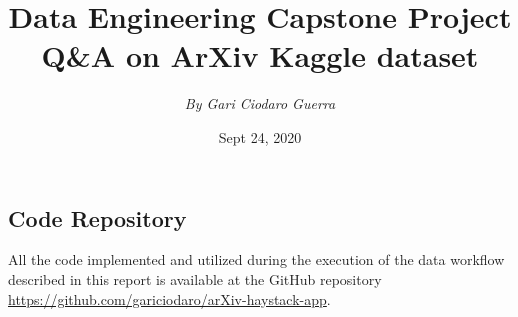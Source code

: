 \documentclass{article}
\title{
    \vspace{1.4cm}
    {\large \textbf{Data Engineering Capstone Project}} \\
    {\large \textbf{Q\&A on ArXiv Kaggle dataset}} \\
}
\author{\textit{By Gari Ciodaro Guerra}\\[0.2cm]}
\date{Sept 24, 2020}
\begin{document}
\maketitle


\newpage





\clearpage
\appendix
\begin{appendices}
\section{Code Repository}

All the code implemented and utilized during the execution of the data workflow
described in this report is available at the GitHub repository \href{https://github.com/gariciodaro/arXiv-haystack-app}{https://github.com/gariciodaro/arXiv-haystack-app}.

\end{appendices}

\clearpage
\newpage
\printbibliography
\end{document}
